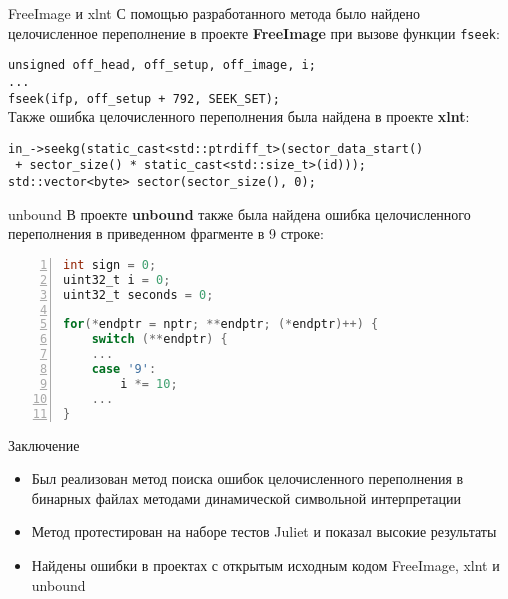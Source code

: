 \documentclass[10pt]{beamer}
\begin{document}
\begin{frame}[fragile]{FreeImage и xlnt}
С помощью разработанного метода было найдено целочисленное переполнение в
проекте \textbf{FreeImage} при вызове функции \texttt{fseek}:

\texttt{unsigned off\_head, off\_setup, off\_image, i;}\\
\texttt{...}\\
\texttt{fseek(ifp, off\_setup + 792, SEEK\_SET);} \\[2em]

Также ошибка целочисленного переполнения была найдена в проекте \textbf{xlnt}:

\texttt{in\_->seekg(static\_cast<std::ptrdiff\_t>(sector\_data\_start()}\\
\texttt{    + sector\_size() * static\_cast<std::size\_t>(id)));} \\
\texttt{std::vector<byte> sector(sector\_size(), 0);}
\end{frame}

\begin{frame}[fragile]{unbound}
В проекте \textbf{unbound} также была найдена ошибка целочисленного переполнения в
приведенном фрагменте в 9 строке:

\begin{lstlisting}[language=C,frame=none,basicstyle=\ttfamily, numbers=left,
                   xleftmargin=2em, numberstyle=\tiny\color{gray}]
int sign = 0;
uint32_t i = 0;
uint32_t seconds = 0;

for(*endptr = nptr; **endptr; (*endptr)++) {
    switch (**endptr) {
    ...
    case '9':
        i *= 10;
    ...
}
\end{lstlisting}
\end{frame}

\begin{frame}{Заключение}
\begin{itemize}
    \item Был реализован метод поиска ошибок целочисленного переполнения в
        бинарных файлах методами динамической символьной интерпретации
    \item Метод протестирован на наборе тестов Juliet и показал высокие
        результаты
    \item Найдены ошибки в проектах с открытым исходным кодом FreeImage, xlnt и
        unbound
\end{itemize}
\end{frame}
\end{document}
